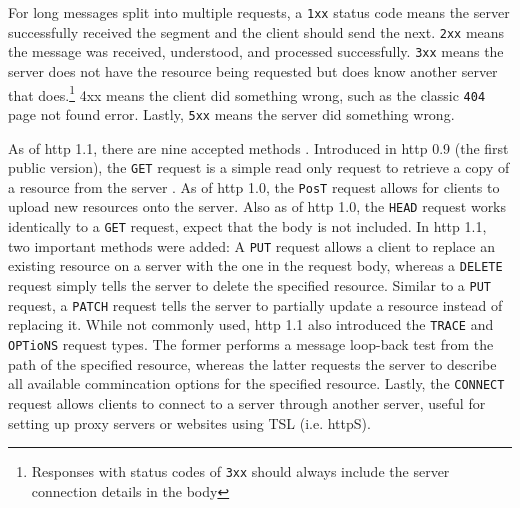 \documentclass[11pt]{article}
\begin{document}
\vspace{0.5\baselineskip}

\inputminted[linenos=true]{html}{http_examples/get_response.html}

\begin{info}
For long messages split into multiple \gls{request}s, a \texttt{1xx} status code means the \gls{server} successfully received the segment and the \gls{client} should send the next. \texttt{2xx} means the message was received, understood, and processed successfully. \texttt{3xx} means the \gls{server} does not have the resource being \gls{request}ed but does know another \gls{server} that does.\footnote{Responses with status codes of \texttt{3xx} should always include the \gls{server} connection details in the body} 4xx means the \gls{client} did something wrong, such as the classic \texttt{404} page not found error. Lastly, \texttt{5xx} means the \gls{server} did something wrong.
\end{info}

As of \acrshort{http} 1.1, there are nine accepted methods \cite{http-methods}. Introduced in \acrshort{http} 0.9 (the first public version), the \texttt{GET} \gls{request} is a simple read only \gls{request} to retrieve a copy of a resource from the \gls{server} \cite{http-0-9}. As of \acrshort{http} 1.0, the \texttt{P\acrshort{os}T} \gls{request} allows for \gls{client}s to upload new resources onto the \gls{server}. Also as of \acrshort{http} 1.0, the \texttt{HEAD} \gls{request} works identically to a \texttt{GET} \gls{request}, expect that the body is not included. In \acrshort{http} 1.1, two important methods were added: A \texttt{PUT} \gls{request} allows a \gls{client} to replace an existing resource on a \gls{server} with the one in the \gls{request} body, whereas a \texttt{DELETE} \gls{request} simply tells the \gls{server} to delete the specified resource. Similar to a \texttt{PUT} \gls{request}, a \texttt{PATCH} \gls{request} tells the \gls{server} to partially update a resource instead of replacing it. While not commonly used, \acrshort{http} 1.1 also introduced the \texttt{TRACE} and \texttt{OPT\acrshort{io}NS} \gls{request} types. The former performs a message loop-back test from the path of the specified resource, whereas the latter \gls{request}s the \gls{server} to describe all available commincation options for the specified resource. Lastly, the \texttt{CONNECT} \gls{request} allows \gls{client}s to connect to a \gls{server} through another \gls{server}, useful for setting up proxy \gls{server}s or websites using TSL (i.e. \acrshort{http}S).
\end{document}
